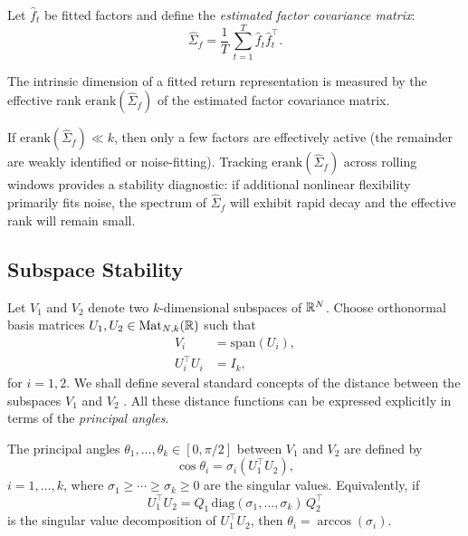 \documentclass[twoside,11pt,letter]{article}
\begin{document}
Let $\hat{f}_t$ be fitted factors and define the \emph{estimated factor covariance matrix}:
\begin{equation}
\hat{\Sigma}_f = \frac{1}{T}\, \sum_{t=1}^T \hat{f}_t \hat{f}_t^\top.
\end{equation}

\begin{definition}
The intrinsic dimension of a fitted return representation is measured by the effective rank $\mathrm{erank}(\hat\Sigma_f)$ of the estimated factor covariance matrix.
\end{definition}

If $\mathrm{erank}(\hat\Sigma_f)\ll k$, then only a few factors are effectively active (the remainder are weakly identified or noise-fitting). Tracking $\mathrm{erank}(\hat{\Sigma}_f)$ across rolling windows provides a stability diagnostic: if additional nonlinear flexibility primarily fits noise, the spectrum of $\hat{\Sigma}_f$ will exhibit rapid decay and the effective rank will remain small.


\subsection{Subspace Stability}

Let $V_1$ and $V_2$ denote two $k$-dimensional subspaces of $\mathbb{R}^N$. Choose orthonormal basis matrices $U_1,U_2\in \mathrm{Mat}_{N,k}(\mathbb{R})$ such that
\begin{equation*}
\begin{split}
V_i&=\mathrm{span}(U_i),\\
U_i^\top U_i&=I_k,
\end{split}
\end{equation*}
for $i=1,2$. We shall define several standard concepts of the distance between the subspaces $V_1$ and $V_2$ \cite{Grass}. All these distance functions can be expressed explicitly in terms of the \emph{principal angles}.

The principal angles $\theta_1,\ldots,\theta_k\in[0,\pi/2]$ between $V_1$ and $V_2$ are defined by 
\begin{equation*}
\cos\theta_i = \sigma_i(U_1^\top U_2),
\end{equation*}
$i=1,\ldots,k$, where $\sigma_1\ge \cdots \ge \sigma_k\ge 0$ are the singular values. Equivalently, if
\begin{equation}\label{eq:svd}
U_1^\top U_2 = Q_1\, \mathrm{diag}(\sigma_1,\ldots,\sigma_k)\, Q_2^\top
\end{equation}
is the singular value decomposition of $U_1^\top U_2$, then $\theta_i=\arccos(\sigma_i)$.
\end{document}
